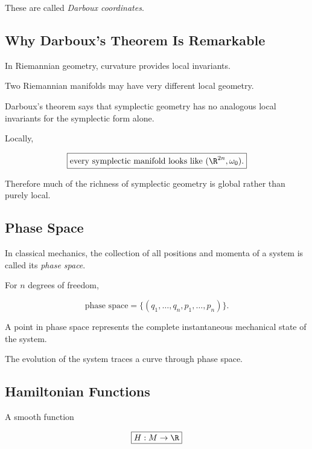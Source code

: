 These are called \emph{Darboux coordinates}.

\subsection{Why Darboux's Theorem Is Remarkable}
\label{subsec:darboux-significance}

In Riemannian geometry, curvature provides local invariants.

Two Riemannian manifolds may have very different local geometry.

Darboux's theorem says that symplectic geometry has no analogous local
invariants for the symplectic form alone.

Locally,

\[
\boxed{
\text{every symplectic manifold looks like }
(\R^{2n},\omega_0).
}
\]

Therefore much of the richness of symplectic geometry is global rather than
purely local.

\subsection{Phase Space}
\label{subsec:phase-space}

In classical mechanics, the collection of all positions and momenta of a
system is called its \emph{phase space}.

For \(n\) degrees of freedom,

\[
\boxed{
\text{phase space}
=
\{(q_1,\ldots,q_n,p_1,\ldots,p_n)\}.
}
\]

A point in phase space represents the complete instantaneous mechanical
state of the system.

The evolution of the system traces a curve through phase space.

\subsection{Hamiltonian Functions}
\label{subsec:hamiltonian-functions}

A smooth function

\[
\boxed{
H:M\to\R
}
\]

